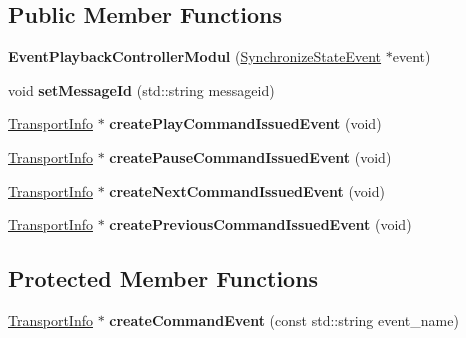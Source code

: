 \subsection*{Public Member Functions}
\begin{DoxyCompactItemize}
\item 
\mbox{\label{classAlexaEvent_1_1EventPlaybackControllerModul_a4afa09960fd2d82fbb03969286635da6}} 
{\bfseries Event\+Playback\+Controller\+Modul} (\hyperlink{structAlexaEvent_1_1SynchronizeStateEvent}{Synchronize\+State\+Event} $\ast$event)
\item 
\mbox{\label{classAlexaEvent_1_1EventPlaybackControllerModul_a5e5013cfbdb5fe3558c8d7d51d0d484e}} 
void {\bfseries set\+Message\+Id} (std\+::string messageid)
\item 
\mbox{\label{classAlexaEvent_1_1EventPlaybackControllerModul_a07f3a14e79bcc1bd14d9329f5fdcca93}} 
\hyperlink{classAlexaEvent_1_1TransportInfo}{Transport\+Info} $\ast$ {\bfseries create\+Play\+Command\+Issued\+Event} (void)
\item 
\mbox{\label{classAlexaEvent_1_1EventPlaybackControllerModul_a1184b7f63a21a32b2ef71336b76890f1}} 
\hyperlink{classAlexaEvent_1_1TransportInfo}{Transport\+Info} $\ast$ {\bfseries create\+Pause\+Command\+Issued\+Event} (void)
\item 
\mbox{\label{classAlexaEvent_1_1EventPlaybackControllerModul_ae668411cd70592db102f965aac1ae150}} 
\hyperlink{classAlexaEvent_1_1TransportInfo}{Transport\+Info} $\ast$ {\bfseries create\+Next\+Command\+Issued\+Event} (void)
\item 
\mbox{\label{classAlexaEvent_1_1EventPlaybackControllerModul_a43f6367fb5d18ddb73f8b462c7e03ce0}} 
\hyperlink{classAlexaEvent_1_1TransportInfo}{Transport\+Info} $\ast$ {\bfseries create\+Previous\+Command\+Issued\+Event} (void)
\end{DoxyCompactItemize}
\subsection*{Protected Member Functions}
\begin{DoxyCompactItemize}
\item 
\mbox{\label{classAlexaEvent_1_1EventPlaybackControllerModul_a16b971f03f1827de714df459a4fabc09}} 
\hyperlink{classAlexaEvent_1_1TransportInfo}{Transport\+Info} $\ast$ {\bfseries create\+Command\+Event} (const std\+::string event\+\_\+name)
\end{DoxyCompactItemize}
